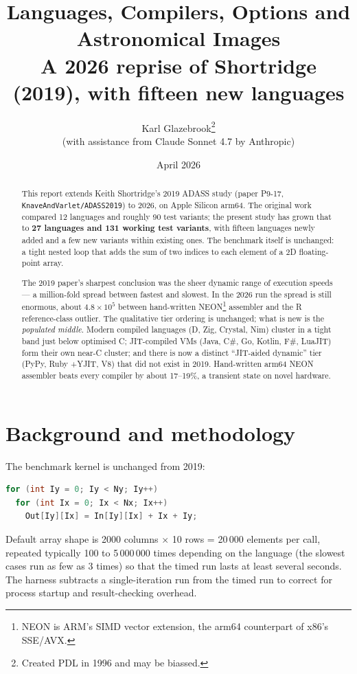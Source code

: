 \documentclass[11pt,a4paper]{article}
\title{Languages, Compilers, Options and\\Astronomical Images\\[6pt]
       \large A 2026 reprise of Shortridge (2019), with fifteen new languages}
\author{Karl Glazebrook\thanks{Created PDL in 1996 and may be
biassed.} \\ \small (with assistance from Claude Sonnet 4.7 by
Anthropic)}
\date{April 2026}
\begin{document}
\maketitle

\begin{abstract}
\noindent
This report extends Keith Shortridge's 2019 ADASS study (paper
P9-17, \texttt{KnaveAndVarlet/\allowbreak ADASS2019}) to 2026, on
Apple Silicon arm64. The original work compared 12 languages and
roughly 90 test variants; the present study has grown that to
\textbf{27 languages and 131 working test variants}, with
fifteen languages newly added and a few new variants within
existing ones. The benchmark itself is unchanged: a tight nested
loop that adds the sum of two indices to each element of a 2D
floating-point array.

The 2019 paper's sharpest conclusion was the sheer dynamic range of
execution speeds --- a million-fold spread between fastest and
slowest. In the 2026 run the spread is still enormous, about
$4.8\times 10^{5}$ between hand-written NEON\footnote{NEON is ARM's
SIMD vector extension, the arm64 counterpart of x86's SSE/AVX.}
assembler and the R reference-class outlier. The qualitative tier
ordering is unchanged; what is new is the \emph{populated middle}.
Modern compiled languages (D, Zig, Crystal, Nim) cluster in a tight
band just below optimised C; JIT-compiled VMs (Java, C\#, Go,
Kotlin, F\#, LuaJIT) form their own near-C cluster; and there is now
a distinct ``JIT-aided dynamic'' tier (PyPy, Ruby +YJIT, V8) that
did not exist in 2019. Hand-written arm64 NEON assembler beats every
compiler by about 17--19\%, a transient state on novel hardware.
\end{abstract}

\section{Background and methodology}

The benchmark kernel is unchanged from 2019:

\begin{lstlisting}[language=C++]
for (int Iy = 0; Iy < Ny; Iy++)
  for (int Ix = 0; Ix < Nx; Ix++)
    Out[Iy][Ix] = In[Iy][Ix] + Ix + Iy;
\end{lstlisting}

\noindent
Default array shape is 2000 columns $\times$ 10 rows = 20\,000
elements per call, repeated typically 100 to 5\,000\,000 times
depending on the language (the slowest cases run as few as 3 times)
so that the timed run lasts at least several seconds. The harness
subtracts a single-iteration run from the timed run to correct for
process startup and result-checking overhead.
\end{document}
